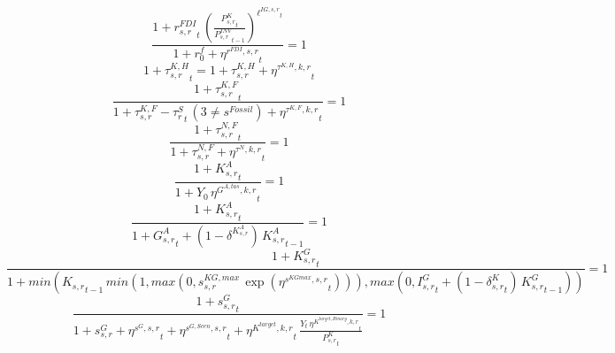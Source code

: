 \noindent[name= `FDI rental rate (returns to foreign investors) 2 1']
\begin{dmath}
\frac{1+{{r^{FDI}_{s,r}}}_{t}\, \left(\frac{{{P^K_{s,r}}}_{t}}{{{P^{INV}_{s,r}}}_{t-1}}\right)^{{{\ell^{IG,s,r}}}_{t}}}{1+{{r^f_0}}+{{\eta^{r^{FDI},s,r}}}_{t}}=1
\end{dmath}
\noindent[name= `taxes on household capital income 3 1']
\begin{dmath}
1+{{\tau^{K,H}_{s,r}}}_{t}=1+{{\tau^{K,H}_{s,r}}}+{{\eta^{\tau^{K,H},k,r}}}_{t}
\end{dmath}
\noindent[name= `sector specific corporate tax rate paid by firms 3 1']
\begin{dmath}
\frac{1+{{\tau^{K,F}_{s,r}}}_{t}}{1+{{\tau^{K,F}_{s,r}}}-{{\tau^{S}_{r}}}_{t}\, \left(3\neq {{s^{Fossil}}}\right)+{{\eta^{\tau^{K,F},k,r}}}_{t}}=1
\end{dmath}
\noindent[name= `sector specific labour tax rate paid by firms 3 1']
\begin{dmath}
\frac{1+{{\tau^{N,F}_{s,r}}}_{t}}{1+{{\tau^{N,F}_{s,r}}}+{{\eta^{\tau^{N},k,r}}}_{t}}=1
\end{dmath}
\noindent[name= `sector specific adaptation capital target from government expenditure 3 1']
\begin{dmath}
\frac{1+{{K^{A}_{s,r}}}_{t}}{1+{{Y_0}}\, {{\eta^{G^{A,tas},k,r}}}_{t}}=1
\end{dmath}
\noindent[name= `sector specific adaptation capital against climate change 3 1']
\begin{dmath}
\frac{1+{{K^{A}_{s,r}}}_{t}}{1+{{G^{A}_{s,r}}}_{t}+\left(1-{{\delta^{K^{A}_{s,r}}}}\right)\, {{K^{A}_{s,r}}}_{t-1}}=1
\end{dmath}
\noindent[name= `sector specific public capital 3 1']
\begin{dmath}
\frac{1+{{K^G_{s,r}}}_{t}}{1+min({{K_{s,r}}}_{t-1}\, min(1,max(0,{{s^{KG,max}_{s,r}}}\, \exp\left({{\eta^{s^{KGmax},s,r}}}_{t}\right))),max(0,{{I^G_{s,r}}}_{t}+\left(1-{{\delta^{K}_{s,r}}}_{t}\right)\, {{K^G_{s,r}}}_{t-1}))}=1
\end{dmath}
\noindent[name= `sector specific public investment 3 1']
\begin{dmath}
\frac{1+{{s^G_{s,r}}}_{t}}{1+{{s^{G}_{s,r}}}+{{\eta^{s^G,s,r}}}_{t}+{{\eta^{s^{G,Scen},s,r}}}_{t}+{{\eta^{K^{target},k,r}}}_{t}\, \frac{{Y}_{t}\, {{\eta^{K^{target,Binary},k,r}}}_{t}}{{{P^K_{s,r}}}_{t}}}=1
\end{dmath}
